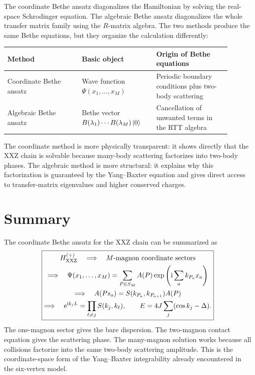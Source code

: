 The coordinate Bethe ansatz diagonalizes the Hamiltonian by solving the real-space
Schrodinger equation.  The algebraic Bethe ansatz diagonalizes the whole transfer
matrix family using the $R$-matrix algebra.  The two methods produce the same
Bethe equations, but they organize the calculation differently:
\begin{center}
\begin{tabular}{@{}L{0.30\linewidth}L{0.30\linewidth}L{0.30\linewidth}@{}}
\toprule
Method & Basic object & Origin of Bethe equations \\
\midrule
Coordinate Bethe ansatz & Wave function
$\Psi(x_1,\ldots,x_M)$ & Periodic boundary conditions plus two-body scattering \\
Algebraic Bethe ansatz & Bethe vector
$B(\lambda_1)\cdots B(\lambda_M)\left|0\right\rangle$ & Cancellation of unwanted terms in the RTT algebra \\
\bottomrule
\end{tabular}
\end{center}
The coordinate method is more physically transparent: it shows directly that the
XXZ chain is solvable because many-body scattering factorizes into two-body
phases.  The algebraic method is more structural: it explains why this
factorization is guaranteed by the Yang--Baxter equation and gives direct access
to transfer-matrix eigenvalues and higher conserved charges.

\section{Summary}
\label{sec:cba-summary}

The coordinate Bethe ansatz for the XXZ chain can be summarized as
\begin{equation}
\label{eq:cba-summary-chain}
\boxed{
\begin{gathered}
    H_{\rm XXZ}^{(+)}
    \quad\Longrightarrow\quad
    M\text{-magnon coordinate sectors}
    \\
    \Longrightarrow\quad
    \Psi(x_1,\ldots,x_M)
    =
    \sum_{P\in S_M}A(P)
    \exp\left(\mathrm{i}\sum_a k_{P_a}x_a\right)
    \\
    \Longrightarrow\quad
    A(Ps_a)=S(k_{P_a},k_{P_{a+1}})A(P)
    \\
    \Longrightarrow\quad
    \mathrm{e}^{\mathrm{i} k_jL}=\prod_{\ell\neq j}S(k_j,k_\ell),
    \qquad
    E=4J\sum_j(\cos k_j-\Delta).
\end{gathered}}
\end{equation}
The one-magnon sector gives the bare dispersion.  The two-magnon contact equation
gives the scattering phase.  The many-magnon solution works because all
collisions factorize into the same two-body scattering amplitude.  This is the
coordinate-space form of the Yang--Baxter integrability already encountered in
the six-vertex model.

